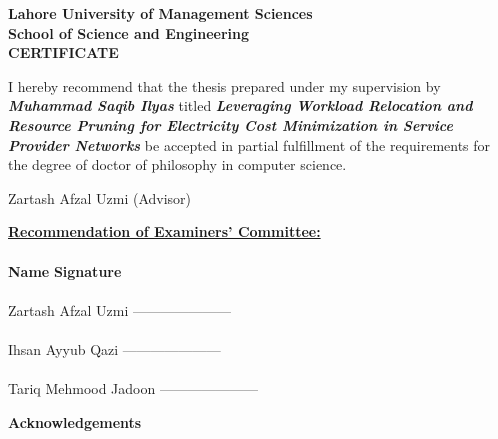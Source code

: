 \newpage
\thispagestyle{empty}
\begin{center}
  \vspace*{1cm}
\textbf{\Large Lahore University of Management Sciences}\\
\vspace*{1cm} \textbf{\large School of Science and
Engineering}\\\vspace*{1cm} \textbf{\large CERTIFICATE}
\end{center}
\vspace*{1cm}I hereby recommend that the thesis prepared under my
supervision by \textbf{\textit{Muhammad Saqib Ilyas}} titled
\textbf{\textit{Leveraging Workload Relocation and Resource Pruning for Electricity Cost Minimization in Service Provider Networks}} be accepted in partial fulfillment of the requirements for the degree of doctor of philosophy in computer science.
\begin{flushright}
Zartash Afzal Uzmi (Advisor) \end{flushright}
\textbf{\underline{Recommendation of Examiners' Committee:}}\\
\\\textbf{Name} \hspace*{6cm} \textbf{Signature}\\ \\
Zartash Afzal Uzmi \hspace*{1.7cm} {---------------------}\\\\
Ihsan Ayyub Qazi \hspace*{1.7cm} {---------------------}\\\\
Tariq Mehmood Jadoon\hspace*{1.7cm} {---------------------}

\newpage
\thispagestyle{empty}
\begin{center}
  \vspace*{1cm}
  \textbf{\large Acknowledgements}
\end{center}

